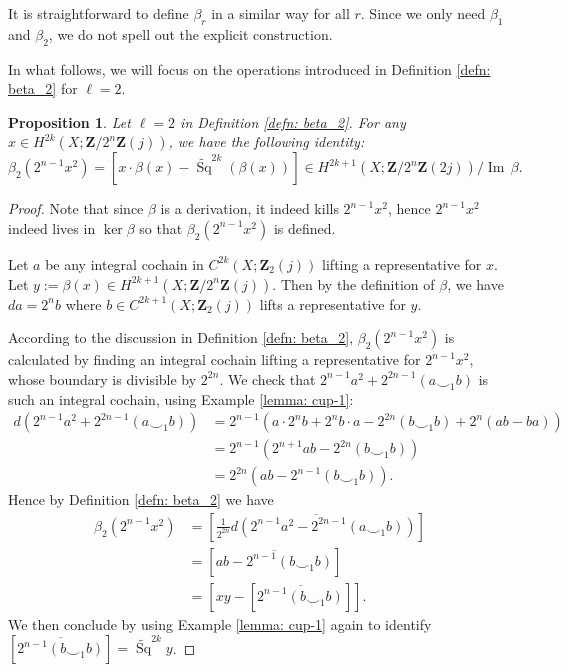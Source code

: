 \documentclass[10pt, reqno]{amsart}
\numberwithin{equation}{subsection}
\newcommand{\wt}[1]{\widetilde{#1}}
\newcommand{\Z}{\mathbf{Z}}
\newcommand{\ol}[1]{\overline{#1}}
\DeclareMathOperator{\et}{\acute{e}t}
\DeclareMathOperator{\Ima}{Im\,}
\DeclareMathOperator{\Sq}{Sq}
\newtheorem{prop}[thm]{Proposition}
\theoremstyle{remark}
\begin{document}
It is straightforward to define $\beta_r$ in a similar way for all $r$. Since we only need $\beta_1$ and $\beta_2$, we do not spell out the explicit construction. 


 In what follows, we will focus on the operations introduced in Definition \ref{defn: beta_2} for $\ell=2$. 

 \begin{prop}\label{prop: beta_2 identity}
Let $\ell=2$ in Definition \ref{defn: beta_2}. For any $x \in H^{2k}_{\et}(X;\Z/2^n\Z(j))$, we have the following identity:
\[
\beta_2(2^{n-1} x^2)= [x \cdot \beta (x) - \wt{\Sq}^{2k} (\beta (x)) ] \in H^{2k+1}_{\et}(X;\Z/2^n\Z(2j))/\Ima \beta.
\]
 \end{prop}
 
 

\begin{proof}
Note that since $\beta$ is a derivation, it indeed kills $2^{n-1} x^2$, hence $2^{n-1} x^2$ indeed lives in $\ker \beta$ so that $\beta_2(2^{n-1} x^2)$ is defined.

Let $a$ be any integral cochain in $C^{2k}_{\et}(X; \Z_{2}(j))$ lifting a representative for $x$. Let $y := \beta(x) \in H^{2k+1}_{\et}(X; \Z/2^n \Z(j))$. Then by the definition of $\beta$, we have $da = 2^n b$ where $b\in C^{2k+1}_{\et}(X; \Z_{2}(j))$ lifts a representative for $y$. 

According to the discussion in Definition \ref{defn: beta_2}, $\beta_2(2^{n-1} x^2)$ is calculated by finding an integral cochain lifting a representative for $2^{n-1} x^2$, whose boundary is divisible by $2^{2n}$. We check that $2^{n-1} a^2 + 2^{2n-1} (a \smile_1 b)$ is such an integral cochain, using Example \ref{lemma: cup-1}: 
\begin{align*}
d(2^{n-1} a^2 + 2^{2n-1} (a \smile_1 b) ) &= 2^{n-1} (a \cdot 2^n b + 2^n b \cdot a - 2^{2n} (b \smile_1 b) + 2^{n} (ab-ba)) \\
&= 2^{n-1} (2^{n+1} ab - 2^{2n} (b \smile_1 b) ) \\
&= 2^{2n}(ab-2^{n-1} (b \smile_1 b)).
\end{align*}
Hence by Definition \ref{defn: beta_2} we have
\begin{align*}	
\beta_2(2^{n-1}	x^2) &= [\ol{\frac{1}{2^{2n}} d (2^{n-1} a^2 - 2^{2n-1} (a \smile_1 b))}] \\
&= [\ol{ ab-2^{n-1} (b \smile_1 b)}] \\
&= [xy -[\ol{2^{n-1}(b \smile_1 b)}]].
\end{align*}
We then conclude by using Example \ref{lemma: cup-1} again to identify $[\ol{2^{n-1}(b \smile_1 b)}] = \wt{\Sq}^{2k} y$.
\end{proof}
\end{document}
